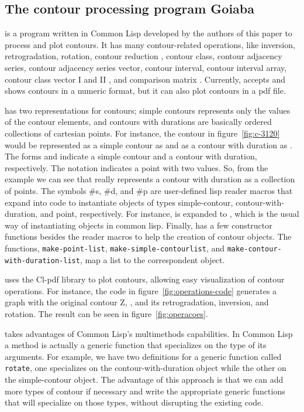 \documentclass[a0paper]{sciposter}
\begin{document}
\begin{multicols}{3}
\section{The contour processing program Goiaba}

\goiaba{} is a program written in Common Lisp developed by the authors
of this paper to process and plot contours. It has many
contour-related operations, like inversion, retrogradation, rotation,
contour reduction \cite{adams76:melodic}, contour class, contour
adjacency series, contour adjacency series vector, contour interval,
contour interval array, contour class vector I and II
\cite{friedmann85:methodology}, and comparison matrix
\cite{morris93:directions}. Currently, \goiaba{} accepts and shows
contours in a numeric format, but it can also plot contours in a pdf
file.

\goiaba{} has two representations for contours; simple contours
represents only the values of the contour elements, and contours with
durations are basically ordered collections of cartesian points. For
instance, the contour in figure~\ref{fig:c-3120} would be represented
as a simple contour as  and as a contour with
duration as . The forms
 and  indicate a simple contour
and a contour with duration, respectively. The notation  indicates a point with two values. So, from the example we can
see that \goiaba{} really represents a contour with duration as a
collection of points. The symbols \#s, \#d, and \#p are user-defined
lisp reader macros that expand into code to instantiate objects of
types simple-contour, contour-with-duration, and point, respectively.
For instance,  is expanded to , which is the usual way of instantiating objects
in common lisp. Finally, \goiaba{} has a few constructor functions
besides the reader macros to help the creation of contour objects. The
functions, \texttt{make-point-list},
\texttt{make-sim\-ple-contour\-list}, and
\texttt{make-contour-with-du\-ra\-tion-list}, map a list to the
correspondent object.

\goiaba{} uses the Cl-pdf library
to plot contours, allowing easy visualization of contour operations.
For instance, the code in figure~\ref{fig:operations-code} generates a
graph with the original contour Z, 
, and its
retrogradation, inversion, and rotation. The result can be seen in
figure~\ref{fig:operacoes}.

\goiaba{} takes advantages of Common Lisp's multimethods capabilities.
In Common Lisp a method is actually a generic function that
specializes on the type of its arguments. For example, we have two
definitions for a generic function called \texttt{rotate}, one
specializes on the contour-with-duration object while the other on the
simple-contour object. The advantage of this approach is that we can
add more types of contour if necessary and write the appropriate
generic functions that will specialize on those types, without
disrupting the existing code.


\end{multicols}
\end{document}
